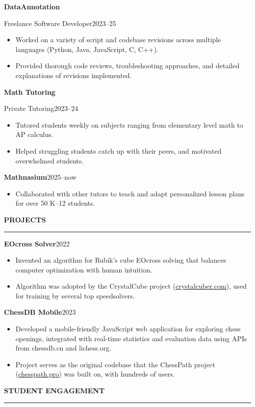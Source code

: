 \documentclass[10pt,letterpaper]{article}
\newcommand{\ressection}[1]{%
  \par\addvspace{7pt}%
  {\large\bfseries #1}\par\nobreak
  \vspace{2pt}\noindent\rule{\linewidth}{1pt}\par\nobreak
  \vspace{4pt}%
}
\newcommand{\entry}[2]{%
  \par\addvspace{4pt}%
  \noindent\textbf{#1}\hfill #2\par\nobreak
}
\newcommand{\subentry}[2]{%
  \noindent #1\hfill #2\par
}
\begin{document}
\entry{DataAnnotation}{}
\subentry{Freelance Software Developer}{2023--25}
\begin{itemize}
  \item Worked on a variety of script and codebase revisions across multiple languages (Python, Java, JavaScript, C, C++).
  \item Provided thorough code reviews, troubleshooting approaches, and detailed explanations of revisions implemented.
\end{itemize}

\entry{Math Tutoring}{}
\subentry{Private Tutoring}{2023--24}
\begin{itemize}
  \item Tutored students weekly on subjects ranging from elementary level math to AP calculus.
  \item Helped struggling students catch up with their peers, and motivated overwhelmed students.
\end{itemize}

\entry{Mathnasium}{2025--now}
\begin{itemize}
  \item Collaborated with other tutors to teach and adapt personalized lesson plans for over 50 K--12 students.
\end{itemize}

\ressection{PROJECTS}

\entry{EOcross Solver}{2022}
\begin{itemize}
  \item Invented an algorithm for Rubik's cube EOcross solving that balances computer optimization with human intuition.
  \item Algorithm was adopted by the CrystalCube project (\href{https://crystalcuber.com}{crystalcuber.com}), used for training by several top speedsolvers.
\end{itemize}

\entry{ChessDB Mobile}{2023}
\begin{itemize}
  \item Developed a mobile-friendly JavaScript web application for exploring chess openings, integrated with real-time statistics and evaluation data using APIs from chessdb.cn and lichess.org.
  \item Project serves as the original codebase that the ChessPath project (\href{https://chesspath.pro}{chesspath.pro}) was built on, with hundreds of users.
\end{itemize}

\ressection{STUDENT ENGAGEMENT}
\end{document}
